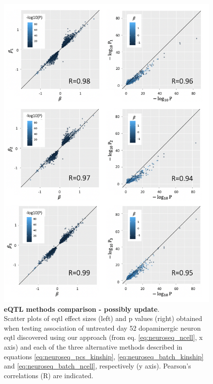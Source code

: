 \begin{figure}[htbp]
\centering
\includegraphics[width=13.5cm]{Chapter5/Fig/neuroseq_eqtl_methods_corr.png}
\caption[eQTL methods comparison]{\textbf{eQTL methods comparison - possibly update}.\\
Scatter plots of \gls{eqtl} effect sizes (left) and p values (right) obtained when testing association of untreated day 52 dopaminergic neuron \gls{eqtl} discovered using our approach (from eq. \eqref{eq:neuroseq_ncell}, x axis) and each of the three alternative methods described in equations \eqref{eq:neuroseq_pcs_kinship}, \eqref{eq:neuroseq_batch_kinship} and \eqref{eq:neuroseq_batch_ncell}, respectively (y axis). 
Pearson's correlations (R) are indicated.}
\label{fig:neuroseq_eqtl_methods_comp}
\end{figure}

